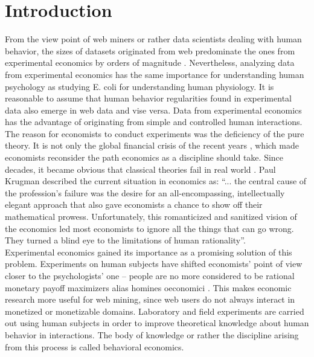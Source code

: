 \documentclass[conference]{IEEEtran}
\begin{document}
\section{Introduction}
\indent From the view point of web miners or rather data scientists dealing with human behavior, the sizes of datasets originated from web predominate the ones from experimental economics by orders of magnitude \cite{vspt}. Nevertheless, analyzing data from experimental economics has the same importance for understanding human psychology as studying E. coli for understanding human physiology. It is reasonable to assume that human behavior regularities found in experimental data also emerge in web data and vise versa. Data from experimental economics has the advantage of originating from simple and controlled human interactions.\\
\indent The reason for economists to conduct experiments was the deficiency of the pure theory. It is not only the global financial crisis of the recent years \cite{maxton}, which made economists reconsider the path economics as a discipline should take. Since decades, it became obvious that classical theories fail in real world \cite{ariely}. Paul Krugman described the current situation in economics as: ``... the central cause of the profession’s failure was the desire for an all-encompassing, intellectually elegant approach that also gave economists a chance to show off their mathematical prowess. Unfortunately, this romanticized and sanitized vision of the economics led most economists to ignore all the things that can go wrong. They turned a blind eye to the limitations of human rationality''.\\
\indent Experimental economics gained its importance as a promising solution of this problem. Experiments on human subjects have shifted economists' point of view closer to the psychologists' one -- people are no more considered to be rational monetary payoff maximizers alias homines oeconomici \cite{behhomo}. This makes economic research more useful for web mining, since web users do not always interact in monetized or monetizable domains. Laboratory and field experiments are carried out using human subjects in order to improve theoretical knowledge about human behavior in interactions. The body of knowledge or rather the discipline arising from this process is called behavioral economics.\\
\end{document}
